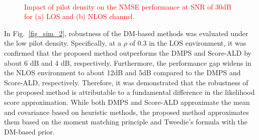 \documentclass[lettersize,journal]{IEEEtran}
\newcommand{\tred}{\textcolor{red}}
\begin{document}
\begin{figure}[!t]
\\
\caption{\tred{Impact of pilot density on the NMSE performance at SNR of 30dB for (a) LOS and (b) NLOS channel.}}
\label{fig_sim_1}
\end{figure}

In Fig.~\ref{fig_sim_2}, robustness of the DM-based methods was evaluated under the low pilot density. Specifically, at a $\rho$ of 0.3 in the LOS environment, it was confirmed that the proposed method outperforms the DMPS and Score-ALD by about 6 dB and 4 dB, respectively. Furthermore, the performance gap widens in the NLOS environment to about 12dB and 5dB compared to the DMPS and Score-ALD, respectively. Therefore, it was demonstrated that the robustness of the proposed method is attributable to a fundamental difference in the likelihood score approximation. While both DMPS and Score-ALD approximate the mean and covariance based on heuristic methods, the proposed method approximates them based on the moment matching principle and Tweedie's formula with the DM-based prior.
\end{document}
